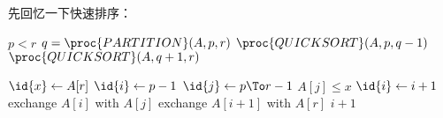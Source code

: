 \documentclass[a4paper,11pt]{ctexbook}
\begin{document}
先回忆一下快速排序：
\begin{codebox}
	\li \If$ p < r $
	\li \Then 
		$ q = \proc{PARTITION}(A,p,r) $
	\li $ \proc{QUICKSORT}(A,p,q-1)$
	\li $ \proc{QUICKSORT}(A,q+1,r)$
		\End
\end{codebox}
\begin{codebox}
	\li $ \id{x} \gets A[r] $
	\li $ \id{i} \gets p-1 $
	\li \For$ \id{j} \gets p \To r-1 $
	\li \Do
			\If $ A[j] \leq x $
	\li 		\Then
					$ \id{i} \gets i+1 $
	\li 			exchange  $ A[i]$ with $A[j]$
				\End
		\End
	\li exchange $A[i+1]$ with $A[r] $
	\li \Return $ i+1 $
\end{codebox}
\end{document}
